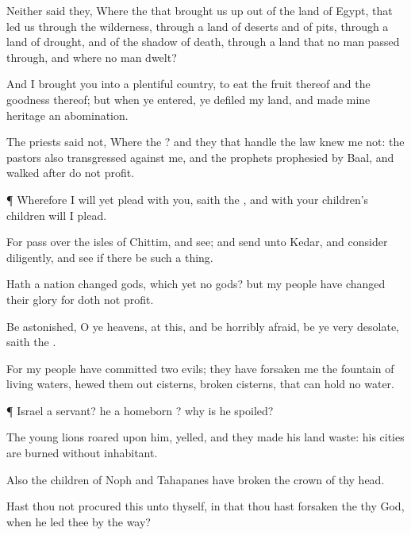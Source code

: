 {Neither
said they, Where
{} the
{} that brought us
up out of the
land of
Egypt, that
led us through the
wilderness, through a
land of
deserts and of
pits, through a
land of
drought, and of the shadow of
death, through a
land that no
man passed
through, and where no
man
dwelt?

And I
brought you into a
plentiful
country, to
eat the
fruit thereof and the
goodness thereof; but when ye
entered, ye
defiled my
land, and
made mine
heritage an
abomination.

The
priests
said not, Where
{} the
{}? and they that
handle the
law
knew me not: the
pastors also
transgressed against me, and the
prophets
prophesied by
Baal, and
walked
after
{} do not
profit.


\par }{\PP {}¶ Wherefore I will yet
plead with you,
saith the
{}, and with your
children’s
children will I
plead.

For pass
over the
isles of
Chittim, and
see; and
send unto
Kedar, and
consider
diligently, and
see if there be such a thing.

Hath a
nation
changed
{}
gods, which
{} yet no
gods? but my
people have
changed their
glory for
{} doth not
profit.

Be
astonished, O ye
heavens, at this, and be horribly
afraid, be ye
very
desolate,
saith the
{}.

For my
people have
committed
two
evils; they have
forsaken me the
fountain of
living
waters,
{} hewed them
out
cisterns,
broken
cisterns, that can
hold no
water.


\par }{\PP {}¶
{}
Israel a
servant?
{} he a
homeborn
{}?
why is he
spoiled?

The young
lions
roared upon him,
{}
yelled, and they
made his
land
waste: his
cities are
burned without
inhabitant.

Also the
children of
Noph and
Tahapanes have
broken the crown of thy
head.

Hast thou not
procured this unto thyself, in that thou hast
forsaken the
{} thy
God,
when he
led thee by the
way?

}
